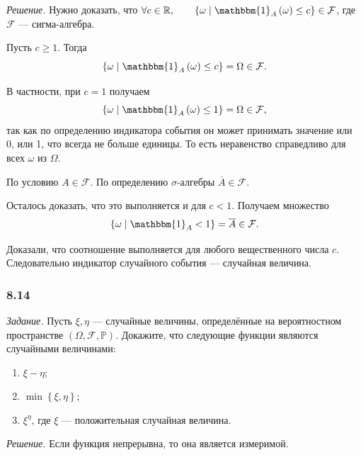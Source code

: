 \textit{Решение.}
Нужно доказать,
что $ \forall c \in \mathbb{R}, \qquad \left\{ \omega \; \middle| \; \mathbbm{1}_A \left( \omega \right) \leq c \right\} \in \mathcal{F} $,
где $ \mathcal{F} $ --- сигма-алгебра.

Пусть $c \geq 1$.
Тогда
$$ \left\{ \omega \; \middle| \;
\mathbbm{1}_A \left( \omega \right) \leq
c \right\} =
\Omega \in
\mathcal{F}.$$

В частности, при $c = 1$ получаем
$$ \left\{ \omega \; \middle| \;
\mathbbm{1}_A \left( \omega \right) \leq
1 \right\} =
\Omega \in
\mathcal{F},$$
так как по определению индикатора события он может принимать значение или 0, или 1, что всегда не больше единицы.
То есть неравенство справедливо для всех $ \omega $ из $ \Omega $.

По условию $A \in \mathcal{F}$.
По определению $ \sigma $-алгебры $ \overline{A} \in \mathcal{F} $.

Осталось доказать, что это выполняется и для $c < 1$.
Получаем множество
$$ \left\{ \omega \; \middle| \;
\mathbbm{1}_A < 1 \right\} =
\overline{A} \in \mathcal{F}.$$

Доказали, что соотношение выполняется для любого вещественного числа $c$.
Следовательно индикатор случайного события --- случайная величина.

\subsubsection*{8.14}

\textit{Задание.} Пусть $ \xi, \eta $ --- случайные величины, определённые на вероятностном пространстве $ \left( \Omega, \mathcal{F}, \mathbb{P} \right) $.
Докажите, что следующие функции являются случайными величинами:
\begin{enumerate}[label=\alph*)]
\item $ \xi - \eta $;
\item $ \min \left\{ \xi, \eta \right\} $;
\item $ \xi^{ \eta } $, где $ \xi $ --- положительная случайная величина.
\end{enumerate}

\textit{Решение.} Если функция непрерывна, то она является измеримой.

